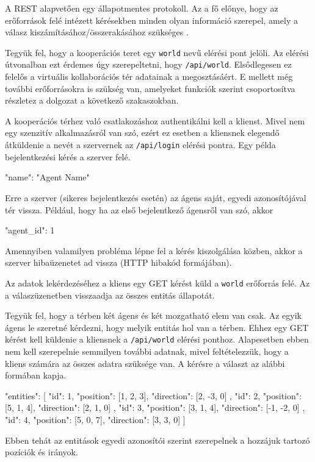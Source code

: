 


A REST alapvetően egy állapotmentes protokoll.
Az a fő előnye, hogy az erőforrások felé intézett kérésekben minden olyan információ szerepel, amely a válasz kiszámításához/összerakásához szükséges \cite{sohan2017study}.

Tegyük fel, hogy a kooperációs teret egy \texttt{world} nevű elérési pont jelöli.
Az elérési útvonalban ezt érdemes úgy szerepeltetni, hogy \texttt{/api/world}.
Elsődlegesen ez felelős a virtuális kollaborációs tér adatainak a megosztásáért.
E mellett még további erőforrásokra is szükség van, amelyeket funkciók szerint csoportosítva részletez a dolgozat a következő szakaszokban.


A kooperációs térhez való csatlakozáshoz authentikálni kell a klienst.
Mivel nem egy szenzitív alkalmazásról van szó, ezért ez esetben a kliensnek elegendő átküldenie a nevét a szervernek az \texttt{/api/login} elérési pontra.
Egy példa bejelentkezési kérés a szerver felé.
\begin{python}
{ "name": "Agent Name" }
\end{python}
Erre a szerver (sikeres bejelentkezés esetén) az ágens saját, egyedi azonosítójával tér vissza.
Például, hogy ha az első bejelentkező ágensről van szó, akkor
\begin{python}
{ "agent_id": 1 }
\end{python}
Amennyiben valamilyen probléma lépne fel a kérés kiszolgálása közben, akkor a szerver hibaüzenetet ad vissza (HTTP hibakód formájában).


Az adatok lekérdezéséhez a kliens egy GET kérést küld a \texttt{world} erőforrás felé.
Az a válaszüzenetben visszaadja az összes entitás állapotát.

Tegyük fel, hogy a térben két ágens és két mozgatható elem van csak.
Az egyik ágens le szeretné kérdezni, hogy melyik entitás hol van a térben.
Ehhez egy GET kérést kell küldenie a kliensnek a \texttt{/api/world} elérési ponthoz.
Alapesetben ebben nem kell szerepelnie semmilyen további adatnak, mivel feltételezzük, hogy a kliens számára az összes adatra szüksége van.
A kérésre a választ az alábbi formában kapja.
\begin{python}
{
  "entities": [
    {
      "id": 1,
      "position": [1, 2, 3],
      "direction": [2, -3, 0]
    },
    {
      "id": 2,
      "position": [5, 1, 4],
      "direction": [2, 1, 0]
    },
    {
      "id": 3,
      "position": [3, 1, 4],
      "direction": [-1, -2, 0]
    },
    {
      "id": 4,
      "position": [5, 0, 7],
      "direction": [3, 3, 0]
    }
  ]
}
\end{python}
Ebben tehát az entitások egyedi azonosítói szerint szerepelnek a hozzájuk tartozó pozíciók és irányok.

